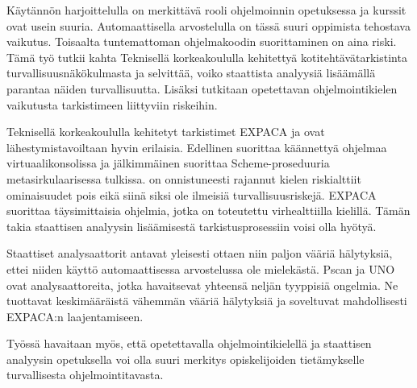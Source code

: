 %
%

\begin{fiabstract}
Käytännön harjoittelulla on merkittävä rooli ohjelmoinnin opetuksessa ja
kurssit ovat usein suuria. Automaattisella arvostelulla on tässä suuri
oppimista tehostava vaikutus. Toisaalta tuntemattoman ohjelmakoodin
suorittaminen on aina riski. Tämä työ tutkii kahta Teknisellä korkeakoululla
kehitettyä kotitehtävätarkistinta turvallisuusnäkökulmasta ja selvittää, voiko
staattista analyysiä lisäämällä parantaa näiden turvallisuutta. Lisäksi
tutkitaan opetettavan ohjelmointikielen vaikutusta tarkistimeen liittyviin
riskeihin.

Teknisellä korkeakoululla kehitetyt tarkistimet EXPACA ja {\scmrobo} ovat
lähestymistavoiltaan hyvin erilaisia. Edellinen suorittaa käännettyä ohjelmaa
virtuaalikonsolissa ja jälkimmäinen suorittaa Scheme-proseduuria
metasirkulaarisessa tulkissa. {\scmrobo} on onnistuneesti rajannut kielen
riskialttiit ominaisuudet pois eikä siinä siksi ole ilmeisiä
turvallisuusriskejä. EXPACA suorittaa täysimittaisia ohjelmia, jotka on
toteutettu virhealttiilla kielillä. Tämän takia staattisen analyysin
lisäämisestä tarkistusprosessiin voisi olla hyötyä.

Staattiset analysaattorit antavat yleisesti ottaen niin paljon vääriä
hälytyksiä, ettei niiden käyttö automaattisessa arvostelussa ole mielekästä.
Pscan ja UNO ovat analysaattoreita, jotka havaitsevat yhteensä neljän tyyppisiä
ongelmia. Ne tuottavat keskimääräistä vähemmän vääriä hälytyksiä ja soveltuvat
mahdollisesti EXPACA:n laajentamiseen.

Työssä havaitaan myös, että opetettavalla ohjelmointikielellä ja staattisen
analyysin opetuksella voi olla suuri merkitys opiskelijoiden tietämykselle
turvallisesta ohjelmointitavasta.
\end{fiabstract}


